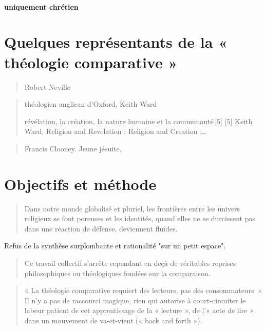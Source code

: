 \paragraph{uniquement chrétien}


\section{Quelques représentants de la « théologie comparative »}

\begin{quote}
        Robert Neville
\end{quote}
\begin{quote}
        théologien anglican d’Oxford, Keith Ward
 
        révélation, la création, la nature humaine et la communauté [5] [5] Keith Ward, Religion and Revelation ; Religion and Creation ;…
\end{quote}
 \begin{quote}
        Francis Clooney. Jeune jésuite,
\end{quote}
 
 
 
 
 \section{Objectifs et méthode}
 
 \begin{quote}
        Dans notre monde globalisé et pluriel, les frontières entre les univers religieux se font poreuses et les identités, quand elles ne se durcissent pas dans une réaction de défense, deviennent fluides.
\end{quote}
Refus de la synthèse surplombante et rationalité "sur un petit espace".

 \begin{quote}
        Ce travail collectif s’arrête cependant en deçà de véritables reprises philosophiques ou théologiques fondées sur la comparaison.
\end{quote}
 
 \begin{quote}
        « La théologie comparative requiert des lecteurs, pas des consommateurs  » Il n’y a pas de raccourci magique, rien qui autorise à court-circuiter le labeur patient de cet apprentissage de la « lecture », de l’« acte de lire » dans un mouvement de va-et-vient (« back and forth »).
\end{quote}

